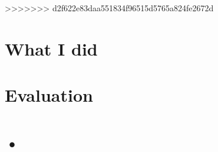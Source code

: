 \documentclass[11pt,a4paper]{report}
\begin{document}
>>>>>>> d2f622e83daa551834f96515d5765a824fe2672d


\section{What I did}



\section{Evaluation}



\section{•}
\end{document}
